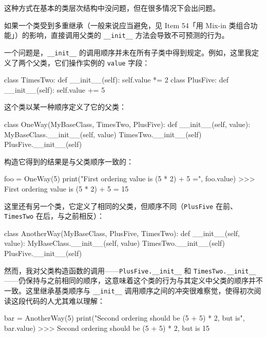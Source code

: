这种方式在基本的类层次结构中没问题，但在很多情况下会出问题。

如果一个类受到多重继承（一般来说应当避免，见 Item 54「用 Mix-in 类组合功能」）的影响，直接调用父类的 \texttt{\_\_init\_\_} 方法会导致不可预测的行为。

一个问题是，\texttt{\_\_init\_\_} 的调用顺序并未在所有子类中得到规定。例如，这里我定义了两个父类，它们操作实例的 \texttt{value} 字段：

\begin{codebox}[python]
class TimesTwo:
    def __init__(self):
        self.value *= 2
class PlusFive:
    def __init__(self):
        self.value += 5
\end{codebox}

这个类以某一种顺序定义了它的父类：

\begin{codebox}[python]
class OneWay(MyBaseClass, TimesTwo, PlusFive):
    def __init__(self, value):
        MyBaseClass.__init__(self, value)
        TimesTwo.__init__(self)
        PlusFive.__init__(self)
\end{codebox}

构造它得到的结果是与父类顺序一致的：

\begin{codebox}[python]
foo = OneWay(5)
print("First ordering value is (5 * 2) + 5 =", foo.value)
>>>
First ordering value is (5 * 2) + 5 = 15
\end{codebox}

这里还有另一个类，它定义了相同的父类，但顺序不同（\texttt{PlusFive} 在前、\texttt{TimesTwo} 在后，与之前相反）：

\begin{codebox}[python]
class AnotherWay(MyBaseClass, PlusFive, TimesTwo):
    def __init__(self, value):
        MyBaseClass.__init__(self, value)
        TimesTwo.__init__(self)
        PlusFive.__init__(self)
\end{codebox}

然而，我对父类构造函数的调用——\texttt{PlusFive.\_\_init\_\_} 和 \texttt{TimesTwo.\_\_init\_\_}——仍保持与之前相同的顺序，这意味着这个类的行为与其定义中父类的顺序并不一致。这里继承基类顺序与 \texttt{\_\_init\_\_} 调用顺序之间的冲突很难察觉，使得初次阅读这段代码的人尤其难以理解：

\begin{codebox}[python]
bar = AnotherWay(5)
print("Second ordering should be (5 + 5) * 2, but is", bar.value)
>>>
Second ordering should be (5 + 5) * 2, but is 15
\end{codebox}

